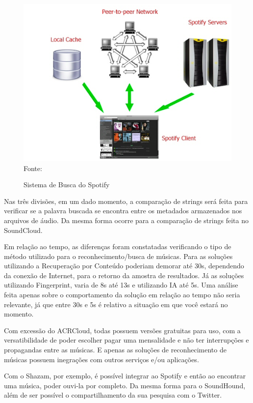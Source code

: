 \begin{figure}[!htb]
   \centering
   \caption{Sistema de Busca do Spotify}\label{fig:spotifyp2p} 
   \includegraphics[scale=0.8]{figuras/spotifyp2p.png}
   \\Fonte: \cite{kreitz2010}
\end{figure}

Nas três divisões, em um dado momento, a comparação de strings será feita para verificar se a palavra buscada se encontra entre os metadados armazenados nos arquivos de áudio. Da mesma forma ocorre para a comparação de strings feita no SoundCloud.

Em relação ao tempo, as diferenças foram constatadas verificando o tipo de método utilizado para o reconhecimento/busca de músicas. Para as soluções utilizando a Recuperação por Conteúdo poderiam demorar até 30s, dependendo da conexão de Internet, para o retorno da amostra de resultados. Já as soluções utilizando Fingerprint, varia de 8s até 13s e utilizando IA até 5s. Uma análise feita apenas sobre o comportamento da solução em relação ao tempo não seria relevante, já que entre 30s e 5s é relativo a situação em que você estará no momento.

Com excessão do ACRCloud, todas possuem versões gratuitas para uso, com a versatibilidade de poder escolher pagar uma mensalidade e não ter interrupções e propagandas entre as músicas. E apenas as soluções de reconhecimento de músicas possuem inegrações com outros serviços e/ou aplicações.

Com o Shazam, por exemplo, é possível integrar ao Spotify e então ao encontrar uma música, poder ouvi-la por completo. Da mesma forma para o SoundHound, além de ser possível o compartilhamento da sua pesquisa com o Twitter. 

